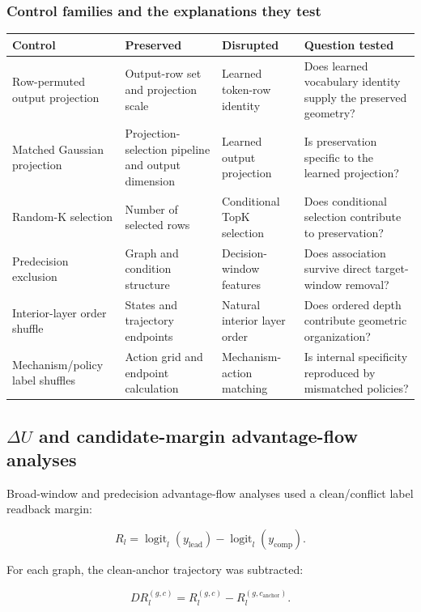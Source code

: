 \documentclass[11pt]{article}
\begin{document}
\subsubsection*{Control families and the explanations they test}
\begin{table}[H]
\centering\scriptsize\sloppy
\begin{tabularx}{\textwidth}{@{}XXXX@{}}
\toprule
Control & Preserved & Disrupted & Question tested \\
\midrule
Row-permuted output projection & Output-row set and projection scale & Learned token-row identity & Does learned vocabulary identity supply the preserved geometry? \\
Matched Gaussian projection & Projection-selection pipeline and output dimension & Learned output projection & Is preservation specific to the learned projection? \\
Random-K selection & Number of selected rows & Conditional TopK selection & Does conditional selection contribute to preservation? \\
Predecision exclusion & Graph and condition structure & Decision-window features & Does association survive direct target-window removal? \\
Interior-layer order shuffle & States and trajectory endpoints & Natural interior layer order & Does ordered depth contribute geometric organization? \\
Mechanism/policy label shuffles & Action grid and endpoint calculation & Mechanism-action matching & Is internal specificity reproduced by mismatched policies? \\
\bottomrule
\end{tabularx}
\end{table}

\subsection*{\(\Delta U\) and candidate-margin advantage-flow analyses}
Broad-window and predecision advantage-flow analyses used a clean/conflict label readback margin:

\begin{equation*}
R_l=\operatorname{logit}_l(y_{\mathrm{lead}})-\operatorname{logit}_l(y_{\mathrm{comp}}).
\end{equation*}

For each graph, the clean-anchor trajectory was subtracted:

\begin{equation*}
DR_l^{(g,c)}=R_l^{(g,c)}-R_l^{(g,c_{\mathrm{anchor}})}.
\end{equation*}
\end{document}
